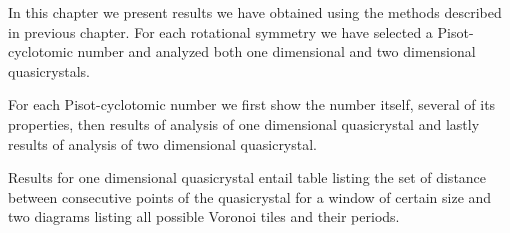 \documentclass[text.tex]{subfiles}
\begin{document}
In this chapter we present results we have obtained using the methods described in previous chapter. For each rotational symmetry we have selected a Pisot-cyclotomic number and analyzed both one dimensional and two dimensional quasicrystals. 

For each Pisot-cyclotomic number we first show the number itself, several of its properties, then results of analysis of one dimensional quasicrystal and lastly results of analysis of two dimensional quasicrystal. 

Results for one dimensional quasicrystal entail table listing the set of distance between consecutive points of the quasicrystal for a window of certain size and two diagrams listing all possible Voronoi tiles and their periods. 
\end{document}
